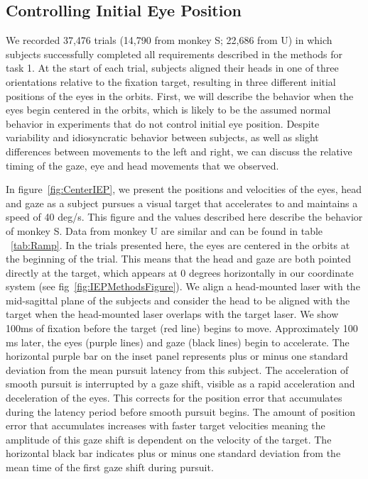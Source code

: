 \documentclass[12pt]{article}
\begin{document}
\subsection{Controlling Initial Eye Position}
We recorded 37,476 trials (14,790 from monkey S; 22,686 from U) in which subjects successfully completed all requirements described in the methods for task 1. At the start of each trial, subjects aligned their heads in one of three orientations relative to the fixation target, resulting in three different initial positions of the eyes in the orbits. First, we will describe the behavior when the eyes begin centered in the orbits, which is likely to be the assumed normal behavior in experiments that do not control initial eye position. Despite variability and idiosyncratic behavior between subjects, as well as slight differences between movements to the left and right, we can discuss the relative timing of the gaze, eye and head movements that we observed.

In figure~\ref{fig:CenterIEP}, we present the positions and velocities of the eyes, head and gaze as a subject pursues a visual target that accelerates to and maintains a speed of 40 deg/s. This figure and the values described here describe the behavior of monkey S. Data from monkey U are similar and can be found in table ~\ref{tab:Ramp}. In the trials presented here, the eyes are centered in the orbits at the beginning of the trial. This means that the head and gaze are both pointed directly at the target, which appears at 0 degrees horizontally in our coordinate system (see fig~\ref{fig:IEPMethodsFigure}). We align a head-mounted laser with the mid-sagittal plane of the subjects and consider the head to be aligned with the target when the head-mounted laser overlaps with the target laser. We show 100ms of fixation before the target (red line) begins to move. Approximately 100 ms later, the eyes (purple lines) and gaze (black lines) begin to accelerate. The horizontal purple bar on the inset panel represents plus or minus one standard deviation from the mean pursuit latency from this subject. The acceleration of smooth pursuit is interrupted by a gaze shift, visible as a rapid acceleration and deceleration of the eyes. This corrects for the position error that accumulates during the latency period before smooth pursuit begins. The amount of position error that accumulates increases with faster target velocities meaning the amplitude of this gaze shift is dependent on the velocity of the target. The horizontal black bar indicates plus or minus one standard deviation from the mean time of the first gaze shift during pursuit. 
\end{document}
